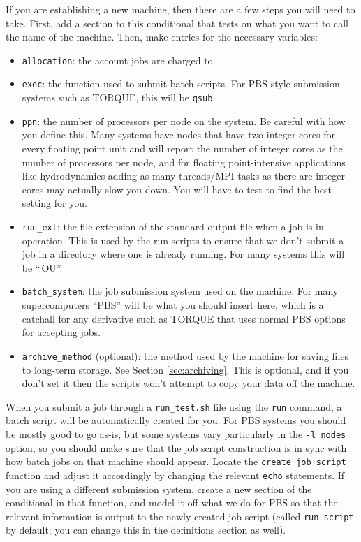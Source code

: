 \documentclass[12pt]{book}
\begin{document}
If you are establishing a new machine, then there are a few steps you will need to take. First, 
add a section to this conditional that tests on what you want to call the name of the machine. 
Then, make entries for the necessary variables:
\begin{itemize}
  \item \texttt{allocation}: the account jobs are charged to.
  \item \texttt{exec}: the function used to submit batch scripts. For PBS-style submission 
systems such as TORQUE, this will be \texttt{qsub}.
  \item \texttt{ppn}: the number of processors per node on the system. Be careful with how 
you define this. Many systems have nodes that have two integer cores for every floating point
unit and will report the number of integer cores as the number of processors per node, 
and for floating point-intensive applications like hydrodynamics adding as many threads/MPI tasks
as there are integer cores may actually slow you down. You will have to test to find 
the best setting for you.
  \item \texttt{run\_ext}: the file extension of the standard output file when a job is in operation. 
This is used by the run scripts to ensure that we don't submit a job in a directory where one is 
already running. For many systems this will be ``.OU''.
  \item \texttt{batch\_system}: the job submission system used on the machine. For many supercomputers 
``PBS'' will be what you should insert here, which is a catchall for any derivative such as TORQUE 
that uses normal PBS options for accepting jobs.
  \item \texttt{archive\_method} (optional): the method used by the machine for saving files to 
long-term storage. See Section \ref{sec:archiving}. This is optional, and if you don't set it then
the scripts won't attempt to copy your data off the machine.
\end{itemize}
When you submit a job through a \texttt{run\_test.sh} file using the \texttt{run} command, 
a batch script will be automatically created for you. For PBS systems you should be mostly 
good to go as-is, but some systems vary particularly in the \texttt{-l nodes} option, so 
you should make sure that the job script construction is in sync with how batch jobs 
on that machine should appear. Locate the \texttt{create\_job\_script} function and adjust it 
accordingly by changing the relevant \texttt{echo} statements. If you are using a different submission
system, create a new section of the conditional in that function, and model it off what we do for PBS
so that the relevant information is output to the newly-created job script (called \texttt{run\_script} 
by default; you can change this in the definitions section as well).
\end{document}
